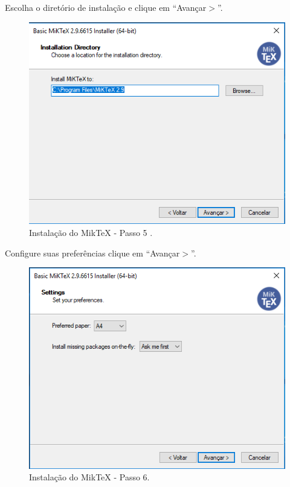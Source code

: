 \newpage
Escolha o diretório de instalação e clique em “Avançar$>$”.\\

\begin{figure}[htb]
  \begin{center}
    \includegraphics[scale=0.7]{imagens/miktex/miktex5.png}
  \end{center}
  \caption{Instalação do MikTeX - Passo 5 .}
  \label{mt5}
\end{figure}

Configure suas preferências clique em “Avançar$>$”.\\

\begin{figure}[htb]
  \begin{center}
    \includegraphics[scale=0.7]{imagens/miktex/miktex6.png}
  \end{center}
  \caption{Instalação do MikTeX - Passo 6.}
  \label{mt6}
\end{figure}

